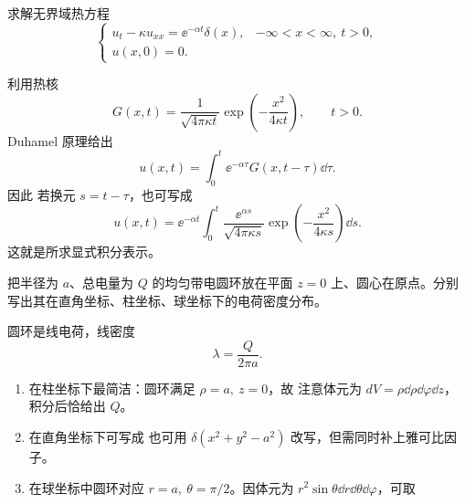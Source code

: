 \begin{question}
求解无界域热方程
\[
\begin{cases}
 u_t-\kappa u_{xx}=\ee^{-\alpha t}\delta(x), & -\infty<x<\infty,\ t>0,\\
 u(x,0)=0.
\end{cases}
\]

\begin{solution}

利用热核
\[
G(x,t)=\frac{1}{\sqrt{4\pi\kappa t}}\exp\!\left(-\frac{x^2}{4\kappa t}\right),\qquad t>0.
\]
Duhamel 原理给出
\[
  u(x,t)=\int_0^t \ee^{-\alpha\tau}G(x,t-\tau)\dd{\tau}.
\]
因此
若换元 $s=t-\tau$，也可写成
\[
  u(x,t)=\ee^{-\alpha t}\int_0^t \frac{\ee^{\alpha s}}{\sqrt{4\pi\kappa s}}
\exp\!\left(-\frac{x^2}{4\kappa s}\right)\dd{s}.
\]
这就是所求显式积分表示。
\end{solution}
\end{question}

\begin{question}
把半径为 $a$、总电量为 $Q$ 的均匀带电圆环放在平面 $z=0$ 上、圆心在原点。分别写出其在直角坐标、柱坐标、球坐标下的电荷密度分布。
\begin{solution}

圆环是线电荷，线密度
\[
\lambda=\frac{Q}{2\pi a}.
\]
\begin{enumerate}[label=(\arabic*),leftmargin=2.8em,itemsep=0.2em]
\item 在柱坐标下最简洁：圆环满足 $\rho=a,\ z=0$，故
注意体元为 $dV=\rho\dd{\rho}\dd{\varphi}\dd{z}$，积分后恰给出 $Q$。
\item 在直角坐标下可写成
也可用 $\delta(x^2+y^2-a^2)$ 改写，但需同时补上雅可比因子。
\item 在球坐标中圆环对应 $r=a,\ \theta=\pi/2$。因体元为 $r^2\sin\theta\dd{r}\dd{\theta}\dd{\varphi}$，可取
\end{enumerate}
\end{solution}
\end{question}

